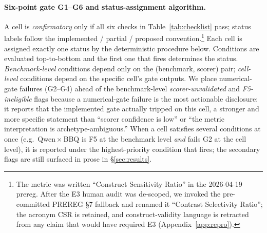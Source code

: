 \paragraph{Six-point gate G1--G6 and status-assignment algorithm.}
\label{par:gate}
A cell is \emph{confirmatory} only if all six checks in
Table~\ref{tab:checklist} pass; status labels follow the
implemented / partial / proposed convention.\footnote{The metric
was written ``Construct Sensitivity Ratio'' in the 2026-04-19
prereg. After the E3 human audit was de-scoped, we invoked the
pre-committed PREREG \S7 fallback and renamed it ``Contrast
Selectivity Ratio''; the acronym CSR is retained, and
construct-validity language is retracted from any claim that
would have required E3 (Appendix~\ref{app:repro}).}
Each cell is assigned exactly one status by the deterministic
procedure below. Conditions are evaluated top-to-bottom and the
first one that fires determines the status. \emph{Benchmark-level}
conditions depend only on the (benchmark, scorer) pair;
\emph{cell-level} conditions depend on the specific cell's gate
outputs. We place numerical-gate failures (G2--G4) ahead of the
benchmark-level \emph{scorer-unvalidated} and \emph{F5-ineligible}
flags because a numerical-gate failure is the most actionable
disclosure: it reports that the implemented gate actually tripped
on this cell, a stronger and more specific statement than ``scorer
confidence is low'' or ``the metric interpretation is
archetype-ambiguous.'' When a cell satisfies several conditions at
once (e.g.\ Qwen\,$\times$\,BBQ is F5 at the benchmark level
\emph{and} fails G2 at the cell level), it is reported under the
highest-priority condition that fires; the secondary flags are
still surfaced in prose in \S\ref{sec:results}.
